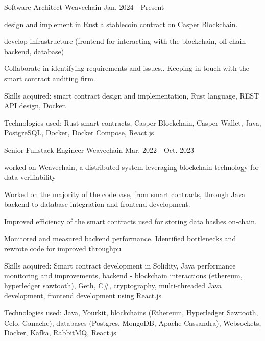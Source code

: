 

\begin{cventries}

  \cventry
    {Software Architect} %
    {Weavechain} %
    {} %
    {Jan. 2024 - Present} %
    {
      \begin{cvitems} %
        \item {design and implement in Rust a stablecoin contract on Casper Blockchain.}
        \item {develop infrastructure (frontend for interacting with the blockchain, off-chain backend, database)}
        \item {Collaborate in identifying requirements and issues.. Keeping in touch with the smart contract auditing firm.}
        \item {Skills acquired: smart contract design and implementation, Rust language, REST API design, Docker.}
        \item {Technologies used: Rust smart contracts, Casper Blockchain, Casper Wallet, Java, PostgreSQL, Docker, Docker Compose, React.js}
      \end{cvitems}
    }

  \cventry
    {Senior Fullstack Engineer} %
    {Weavechain} %
    {} %
    {Mar. 2022 - Oct. 2023} %
    {
      \begin{cvitems} %
        \item {worked on Weavechain, a distributed system leveraging blockchain technology for data verifiability}
        \item {Worked on the majority of the codebase, from smart contracts, through Java backend to database integration and frontend development.}
        \item {Improved efficiency of the smart contracts used for storing data hashes on-chain.}
        \item {Monitored and measured backend performance. Identified bottlenecks and rewrote code for improved throughpu}
        \item {Skills acquired: Smart contract development in Solidity, Java performance monitoring and improvements, backend - blockchain interactions (ethereum, hyperledger sawtooth), Geth, C\#, cryptography, multi-threaded Java development, frontend development using React.js}
        \item {Technologies used: Java, Yourkit, blockchains (Ethereum, Hyperledger Sawtooth, Celo, Ganache), databases (Postgres, MongoDB, Apache Cassandra), Websockets, Docker, Kafka, RabbitMQ, React.js}
      \end{cvitems}
    }


\end{cventries}
